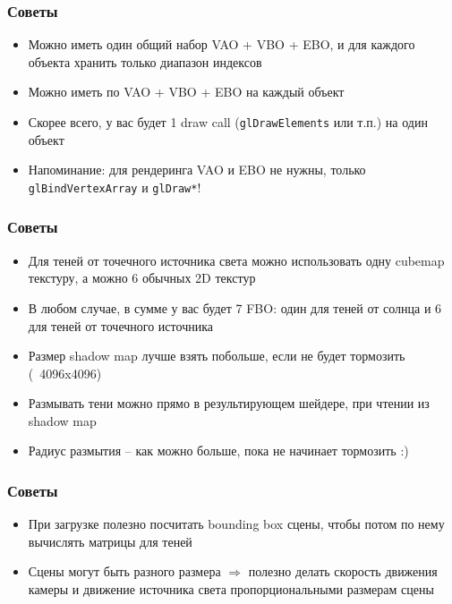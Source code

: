 \documentclass{beamer}
\begin{document}
\begin{frame}[fragile]
\frametitle{Советы}
\begin{itemize}
\item Можно иметь один общий набор VAO + VBO + EBO, и для каждого объекта хранить только диапазон индексов
\item Можно иметь по VAO + VBO + EBO на каждый объект
\item Скорее всего, у вас будет 1 draw call (\verb|glDrawElements| или т.п.) на один объект
\item Напоминание: для рендеринга VAO и EBO не нужны, только \verb|glBindVertexArray| и \verb|glDraw*|!
\end{itemize}
\end{frame}

\begin{frame}[fragile]
\frametitle{Советы}
\begin{itemize}
\item Для теней от точечного источника света можно использовать одну cubemap текстуру, а можно 6 обычных 2D текстур
\item В любом случае, в сумме у вас будет 7 FBO: один для теней от солнца и 6 для теней от точечного источника
\item Размер shadow map лучше взять побольше, если не будет тормозить (~4096x4096)
\item Размывать тени можно прямо в результирующем шейдере, при чтении из shadow map
\item Радиус размытия -- как можно больше, пока не начинает тормозить :)
\end{itemize}
\end{frame}

\begin{frame}[fragile]
\frametitle{Советы}
\begin{itemize}
\item При загрузке полезно посчитать bounding box сцены, чтобы потом по нему вычислять матрицы для теней
\item Сцены могут быть разного размера \begin{math}\Rightarrow\end{math} полезно делать скорость движения камеры и движение источника света пропорциональными размерам сцены
\end{itemize}
\end{frame}
\end{document}
